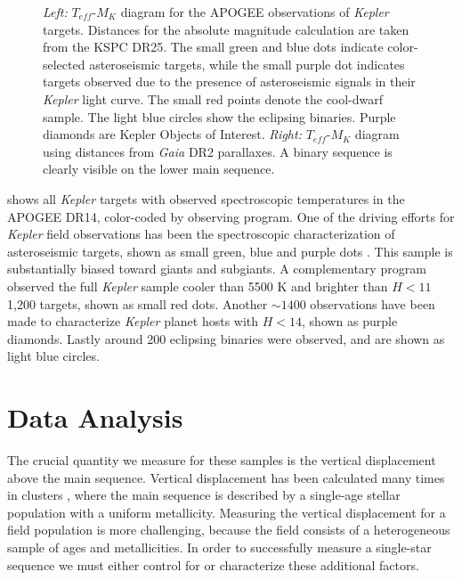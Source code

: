 \documentclass[manuscript]{aastex6}
\newcommand{\Kepler}{\mbox{\textit{Kepler}}}
\newcommand{\Gaia}{\mbox{\textit{Gaia}}}
\newcommand{\Teff}{\ensuremath{T_{eff}}}
\newcommand{\gvs}{\authorcomment1}
\begin{document}
\begin{figure}[htb]
    \centering
    \caption{\emph{Left:} \Teff-\(M_K\) diagram for the APOGEE observations of
        \Kepler{} targets. Distances for the absolute magnitude calculation are
        taken from the KSPC DR25. The small green and blue dots indicate
        color-selected asteroseismic targets, while the small purple dot
        indicates targets observed due to the presence of asteroseismic signals
        in their \Kepler{} light curve. The small red points denote the
        cool-dwarf sample. The light blue circles show the eclipsing binaries.
        Purple diamonds are Kepler Objects of Interest. \emph{Right:} 
        \Teff-\(M_K\) diagram using distances from \Gaia{} DR2 parallaxes. A binary sequence is clearly
visible on the lower main sequence.}\label{fig:apogee_selection}
\end{figure}

 shows all \Kepler{} targets with observed
spectroscopic temperatures in the APOGEE DR14, color-coded by observing
program. One of the driving efforts for \Kepler{} field observations has been
the spectroscopic characterization of asteroseismic targets, shown as small
green, blue and purple dots \citep{Zasowski17,Pinsonneault18}. This sample is 
substantially biased toward giants and subgiants. A complementary program 
observed the full \Kepler{} sample cooler than 5500 K and brighter than 
\(H < 11\) \gvs{Exact number} 1,200 targets, shown as small red dots. Another \(\sim 1400\) observations have been
made to characterize \Kepler{} planet hosts with \(H < 14\), shown as purple
diamonds. Lastly around 200 eclipsing binaries \citep{Prsa11,Slawson11} were
observed, and are shown as light blue circles.

\section{Data Analysis}
\label{sec:analysis}

The crucial quantity we measure for these samples is the vertical displacement
above the main sequence. Vertical displacement has been calculated many times
in clusters \citep{Mermilliod92}, where the main sequence is described by a
single-age stellar population with a uniform metallicity. Measuring the
vertical displacement for a field population is more challenging, because the
field consists of a heterogeneous sample of ages and metallicities. In order to
successfully measure a single-star sequence we must either control for or
characterize these additional factors. 
\end{document}
